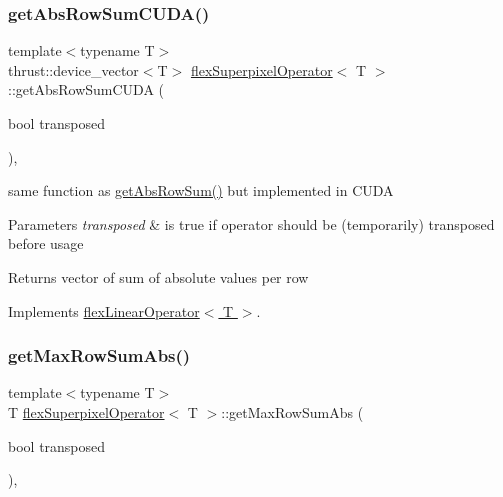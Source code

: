 \subsubsection{\texorpdfstring{get\+Abs\+Row\+Sum\+C\+U\+D\+A()}{getAbsRowSumCUDA()}}
{\footnotesize\ttfamily template$<$typename T$>$ \\
thrust\+::device\+\_\+vector$<$T$>$ \hyperlink{classflex_superpixel_operator}{flex\+Superpixel\+Operator}$<$ T $>$\+::get\+Abs\+Row\+Sum\+C\+U\+DA (\begin{DoxyParamCaption}\item[{bool}]{transposed }\end{DoxyParamCaption})\hspace{0.3cm}{\ttfamily [inline]}, {\ttfamily [virtual]}}



same function as \hyperlink{classflex_superpixel_operator_afd3f55401eaa6fb3e8a62c7f83443a4d}{get\+Abs\+Row\+Sum()} but implemented in C\+U\+DA 


\begin{DoxyParams}{Parameters}
{\em transposed} & is true if operator should be (temporarily) transposed before usage \\
\hline
\end{DoxyParams}
\begin{DoxyReturn}{Returns}
vector of sum of absolute values per row 
\end{DoxyReturn}


Implements \hyperlink{classflex_linear_operator_a0a0a431d43f4f9d36cbee0d31ba5a29b}{flex\+Linear\+Operator$<$ T $>$}.

\mbox{\label{classflex_superpixel_operator_a83c4978b05be05c45be7d2ea58e96b44}} 
\subsubsection{\texorpdfstring{get\+Max\+Row\+Sum\+Abs()}{getMaxRowSumAbs()}}
{\footnotesize\ttfamily template$<$typename T$>$ \\
T \hyperlink{classflex_superpixel_operator}{flex\+Superpixel\+Operator}$<$ T $>$\+::get\+Max\+Row\+Sum\+Abs (\begin{DoxyParamCaption}\item[{bool}]{transposed }\end{DoxyParamCaption})\hspace{0.3cm}{\ttfamily [inline]}, {\ttfamily [virtual]}}



